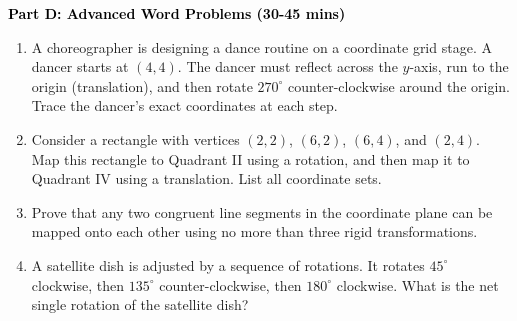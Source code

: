 \documentclass[12pt, letterpaper, fleqn]{article}
\begin{document}
\newpage

\begin{tcolorbox}[colback=customteal!20]
\large\textcolor{black}{\textbf{Part D: Advanced Word Problems (30-45 mins)}}
\end{tcolorbox}

\vspace{3mm}

\begin{enumerate}[itemsep=5.5cm, leftmargin=0.6cm, resume]
\item A choreographer is designing a dance routine on a coordinate grid stage. A dancer starts at $(4, 4)$. The dancer must reflect across the $y$-axis, run to the origin (translation), and then rotate $270^\circ$ counter-clockwise around the origin. Trace the dancer's exact coordinates at each step.
\item Consider a rectangle with vertices $(2, 2)$, $(6, 2)$, $(6, 4)$, and $(2, 4)$. Map this rectangle to Quadrant II using a rotation, and then map it to Quadrant IV using a translation. List all coordinate sets.
\item Prove that any two congruent line segments in the coordinate plane can be mapped onto each other using no more than three rigid transformations.
\item A satellite dish is adjusted by a sequence of rotations. It rotates $45^\circ$ clockwise, then $135^\circ$ counter-clockwise, then $180^\circ$ clockwise. What is the net single rotation of the satellite dish?
\end{enumerate}
\end{document}
